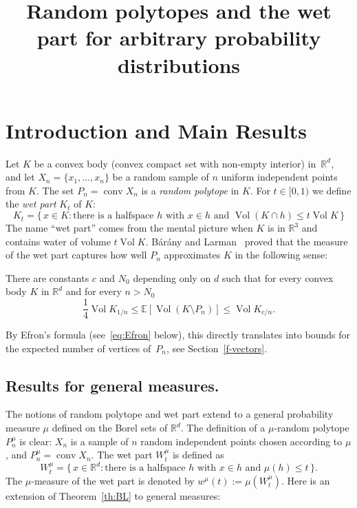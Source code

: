 \documentclass[AHL,Unicode,longabstracts]{cedram}
\title[Random polytopes and the wet part]{Random polytopes and the wet part for arbitrary probability distributions}
\author[\initial{I.} \lastname{Bárány}]{\firstname{Imre} \lastname{Bárány}}
\author[\initial{M.} \lastname{Fradelizi}]{\firstname{Matthieu} \lastname{Fradelizi}}
\author[\initial{X.} \lastname{Goaoc}]{\firstname{Xavier} \lastname{Goaoc}}
\author[\initial{A.} \lastname{Hubard}]{\firstname{Alfredo} \lastname{Hubard}}
\author[\initial{G.} \lastname{Rote}]{\firstname{Günter} \lastname{Rote}}
\DeclareMathOperator{\vol}{Vol}
\DeclareMathOperator{\conv}{conv}
\newcommand{\Rbb}{\mathbb{R}}%
\newcommand{\Ebb}{\mathbb{E}}%
\begin{document}
\maketitle


\section{Introduction and Main Results}

Let $K$ be a convex body (convex compact set with non-empty interior) in~$\Rbb^d$, and let $X_n=\{x_1,\ldots,x_n\}$ be a random sample of $n$ uniform independent points from $K$. The set $P_n=\conv X_n$ is a \emph{random polytope} in $K$. For $t\in [0,1)$ we define the \emph{wet part} $K_t$ of $K$:
\[
K_t=\{\,x \in K: \text{there is a halfspace }h \text{ with } x \in h \text{ and }\vol(K\cap h) \le t\vol K\,\}
\]
The name ``wet part'' comes from the mental picture when $K$ is in $\Rbb^3$ and contains water of volume $t\vol K$. Bárány and Larman~\cite{BarLar} proved that the measure of the wet part captures how well $P_n$ approximates $K$ in the following sense:

\begin{theo} \label{th:BL}
There are constants $c$ and $N_0$ depending only on $d$ such that for every convex body $K$ in $\Rbb^d$ and for every $n>N_0$
\[
\frac 14 \vol K_{1/n} \le \Ebb[\vol(K\setminus P_n)] \le \vol K_{c/n}.
\]
\end{theo}

By Efron's formula (see~\eqref{eq:Efron} below), this directly translates into bounds for the expected number of vertices of~$P_n$, see Section~\ref{f-vectors}.

\subsection{Results for general measures.}

The notions of random polytope and wet part extend to a general probability measure $\mu$ defined on the Borel sets of $\Rbb^d$. The definition of a $\mu$-random polytope $P_n^{\mu}$ is clear: $X_n$ is a sample of $n$ random independent points chosen according to $\mu$, and $P_n^{\mu}=\conv X_n$. The wet part $W_t^{\mu}$ is defined as
\[
W_t^{\mu}=\{\,x \in \Rbb^d: \text{there is a halfspace }h \text{ with } x \in h \text{ and }\mu (h) \le t\,\}.
\]
The $\mu$-measure of the wet part is denoted by $w^{\mu}(t):=\mu(W_t^{\mu})$. Here is an extension of Theorem~\ref{th:BL} to general measures:
\end{document}
